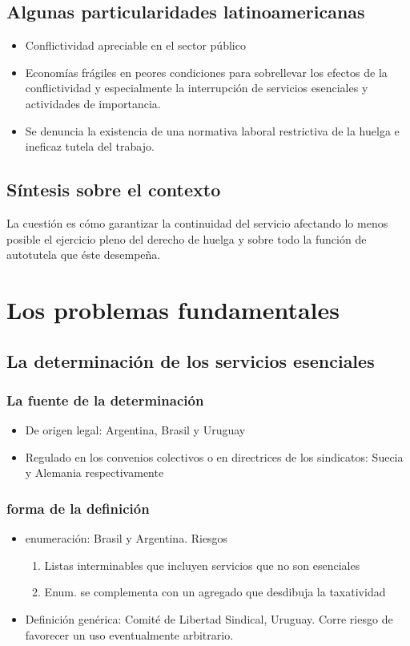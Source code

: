 \documentclass[spanish,12pt,a4paper,titlepage]{report}
\begin{document}
\subsection{Algunas particularidades latinoamericanas}

\begin{itemize}
\item Conflictividad apreciable en el sector público
\item Economías frágiles en peores condiciones para sobrellevar los efectos de la conflictividad y especialmente la interrupción de servicios esenciales y actividades de importancia. 
\item Se denuncia la existencia de una normativa laboral restrictiva de la huelga e ineficaz tutela del trabajo.
\end{itemize}

\subsection{Síntesis sobre el contexto}

La cuestión es cómo garantizar la continuidad del servicio afectando lo menos posible el ejercicio pleno del derecho de huelga y sobre todo la función de autotutela que éste desempeña.

\section{Los problemas fundamentales}
\subsection{La determinación de los servicios esenciales}
\subsubsection{La fuente de la determinación}
\begin{itemize}
\item De origen legal: Argentina, Brasil y Uruguay
\item Regulado en los convenios colectivos o en directrices de los sindicatos: Suecia y Alemania respectivamente
\end{itemize}


\subsubsection{forma de la definición}
\begin{itemize}
\item enumeración: Brasil y Argentina. Riesgos
	\begin{enumerate}
	\item Listas interminables que incluyen servicios que no son esenciales
	\item Enum. se complementa con un agregado que desdibuja la taxatividad
	\end{enumerate}
\item Definición genérica: Comité de Libertad Sindical, Uruguay. Corre riesgo de favorecer un uso eventualmente arbitrario.
\end{itemize}
\end{document}
